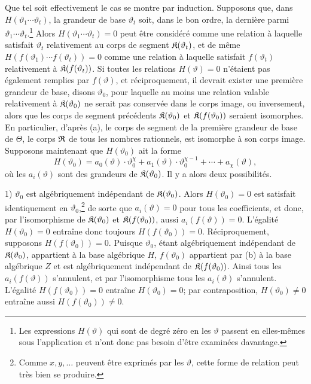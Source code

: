 Que tel soit effectivement le cas se montre par induction. Supposons que, dans $H(\vartheta_1\cdots\vartheta_t)$, la grandeur de base $\vartheta_t$ soit, dans le bon ordre, la dernière parmi $\vartheta_1\cdots\vartheta_t$.\footnote{Les expressions $H(\vartheta)$ qui sont de degré zéro en les $\vartheta$ passent en elles-mêmes sous l'application et n'ont donc pas besoin d'être examinées davantage.} Alors $H(\vartheta_1\cdots\vartheta_t)=0$ peut être considéré comme une relation à laquelle satisfait $\vartheta_t$ relativement au corps de segment $\mathfrak{K}(\vartheta_t)$, et de même $H(f(\vartheta_1)\cdots f(\vartheta_t))=0$ comme une relation à laquelle satisfait $f(\vartheta_t)$ relativement à $\mathfrak{K}(f(\vartheta_t))$. Si toutes les relations $H(\vartheta)=0$ n'étaient pas également remplies par $f(\vartheta)$, et réciproquement, il devrait exister une première grandeur de base, disons $\vartheta_0$, pour laquelle au moins une relation valable relativement à $\mathfrak{K}(\vartheta_0)$ ne serait pas conservée dans le corps image, ou inversement, alors que les corps de segment précédents $\mathfrak{K}(\vartheta_0)$ et $\mathfrak{K}(f(\vartheta_0))$ seraient isomorphes. En particulier, d'après (a), le corps de segment de la première grandeur de base de $\Theta$, le corps $\mathfrak{R}$ de tous les nombres rationnels, est isomorphe à son corps image. Supposons maintenant que $H(\vartheta_0)$ ait la forme
\[
H(\vartheta_0)=a_0(\vartheta)\cdot\vartheta_0^\chi
+a_1(\vartheta)\cdot\vartheta_0^{\chi-1}+\cdots+a_\chi(\vartheta),
\]
où les $a_i(\vartheta)$ sont des grandeurs de $\mathfrak{K}(\vartheta_0)$. Il y a alors deux possibilités.

1) $\vartheta_0$ est algébriquement indépendant de $\mathfrak{K}(\vartheta_0)$. Alors $H(\vartheta_0)=0$ est satisfait identiquement en $\vartheta_0$,\footnote{Comme $x,y,\ldots$ peuvent être exprimés par les $\vartheta$, cette forme de relation peut très bien se produire.} de sorte que $a_i(\vartheta)=0$ pour tous les coefficients, et donc, par l'isomorphisme de $\mathfrak{K}(\vartheta_0)$ et $\mathfrak{K}(f(\vartheta_0))$, aussi $a_i(f(\vartheta))=0$. L'égalité $H(\vartheta_0)=0$ entraîne donc toujours $H(f(\vartheta_0))=0$. Réciproquement, supposons $H(f(\vartheta_0))=0$. Puisque $\vartheta_0$, étant algébriquement indépendant de $\mathfrak{K}(\vartheta_0)$, appartient à la base algébrique $H$, $f(\vartheta_0)$ appartient par (b) à la base algébrique $Z$ et est algébriquement indépendant de $\mathfrak{K}(f(\vartheta_0))$. Ainsi tous les $a_i(f(\vartheta))$ s'annulent, et par l'isomorphisme tous les $a_i(\vartheta)$ s'annulent. L'égalité $H(f(\vartheta_0))=0$ entraîne $H(\vartheta_0)=0$; par contraposition, $H(\vartheta_0)\ne0$ entraîne aussi $H(f(\vartheta_0))\ne0$.

